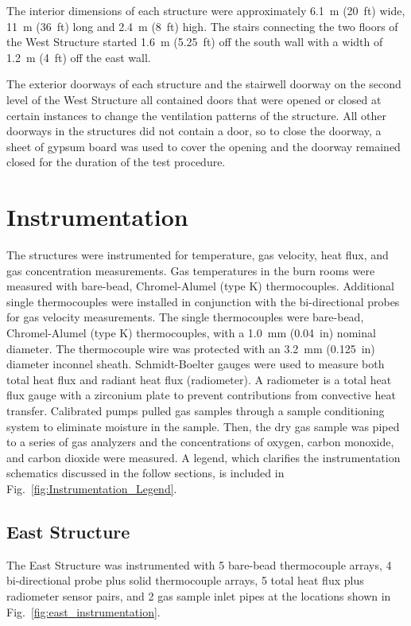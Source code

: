 \documentclass[12pt,oneside]{book}
\begin{document}
The interior dimensions of each structure were approximately 6.1~m (20~ft) wide, 11~m (36~ft) long and 2.4~m (8~ft) high. The stairs connecting the two floors of the West Structure started 1.6~m (5.25~ft) off the south wall with a width of 1.2~m (4~ft) off the east wall.

The exterior doorways of each structure and the stairwell doorway on the second level of the West Structure all contained doors that were opened or closed at certain instances to change the ventilation patterns of the structure. All other doorways in the structures did not contain a door, so to close the doorway, a sheet of gypsum board was used to cover the opening and the doorway remained closed for the duration of the test procedure.
\FloatBarrier

\section{Instrumentation}
\label{sec:Instrumentation}
The structures were instrumented for temperature, gas velocity, heat flux, and gas concentration measurements. Gas temperatures in the burn rooms were measured with bare-bead, Chromel-Alumel (type K) thermocouples. Additional single thermocouples were installed in conjunction with the bi-directional probes for gas velocity measurements. The single thermocouples were bare-bead, Chromel-Alumel (type K) thermocouples, with a 1.0~mm (0.04~in) nominal diameter. The thermocouple wire was protected with an 3.2~mm (0.125~in) diameter inconnel sheath. Schmidt-Boelter gauges were used to measure both total heat flux and radiant heat flux (radiometer). A radiometer is a total heat flux gauge with a zirconium plate to prevent contributions from convective heat transfer. Calibrated pumps pulled gas samples through a sample conditioning system to eliminate moisture in the sample. Then, the dry gas sample was piped to a series of gas analyzers and the concentrations of oxygen, carbon monoxide, and carbon dioxide were measured. A legend, which clarifies the instrumentation schematics discussed in the follow sections, is included in Fig.~\ref{fig:Instrumentation_Legend}.


\subsection{East Structure}
\label{sec:East_Instrumentation}
The East Structure was instrumented with 5 bare-bead thermocouple arrays, 4 bi-directional probe plus solid thermocouple arrays, 5 total heat flux plus radiometer sensor pairs, and 2 gas sample inlet pipes at the locations shown in Fig.~\ref{fig:east_instrumentation}.
\end{document}
